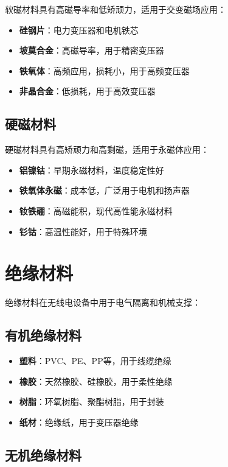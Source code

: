 \documentclass[12pt,UTF8]{ctexbook}
\begin{document}
软磁材料具有高磁导率和低矫顽力，适用于交变磁场应用：

\begin{itemize}[leftmargin=3.5em]
    \item \textbf{硅钢片}：电力变压器和电机铁芯
    \item \textbf{坡莫合金}：高磁导率，用于精密变压器
    \item \textbf{铁氧体}：高频应用，损耗小，用于高频变压器
    \item \textbf{非晶合金}：低损耗，用于高效变压器
\end{itemize}

\section{硬磁材料}

硬磁材料具有高矫顽力和高剩磁，适用于永磁体应用：

\begin{itemize}[leftmargin=3.5em]
    \item \textbf{铝镍钴}：早期永磁材料，温度稳定性好
    \item \textbf{铁氧体永磁}：成本低，广泛用于电机和扬声器
    \item \textbf{钕铁硼}：高磁能积，现代高性能永磁材料
    \item \textbf{钐钴}：高温性能好，用于特殊环境
\end{itemize}

\chapter{绝缘材料}

绝缘材料在无线电设备中用于电气隔离和机械支撑：

\section{有机绝缘材料}

\begin{itemize}[leftmargin=3.5em]
    \item \textbf{塑料}：PVC、PE、PP等，用于线缆绝缘
    \item \textbf{橡胶}：天然橡胶、硅橡胶，用于柔性绝缘
    \item \textbf{树脂}：环氧树脂、聚酯树脂，用于封装
    \item \textbf{纸材}：绝缘纸，用于变压器绝缘
\end{itemize}

\section{无机绝缘材料}
\end{document}

